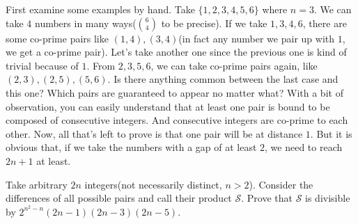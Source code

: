 \documentclass[nt_billal_v1.tex]{subfile}
\begin{document}
	\begin{solution}
		First examine some examples by hand. Take $\{1,2,3,4,5,6\}$ where $n=3$. We can take $4$ numbers in many ways($\binom{6}{4}$ to be precise). If we take $1,3,4,6$, there are some co-prime pairs like $(1,4),(3,4)$(in fact any number we pair up with $1$, we get a co-prime pair). Let's take another one since the previous one is kind of trivial because of $1$. From $2,3,5,6$, we can take co-prime pairs again, like $(2,3),(2,5),(5,6)$. Is there anything common between the last case and this one? Which pairs are guaranteed to appear no matter what? With a bit of observation, you can easily understand that at least one pair is bound to be composed of consecutive integers. And consecutive integers are co-prime to each other. Now, all that's left to prove is that one pair will be at distance $1$. But it is obvious that, if we take the numbers with a gap of at least $2$, we need to reach $2n+1$ at least.
	\end{solution}
	
	\begin{problem}
		Take arbitrary $2n$ integers(not necessarily distinct, $n>2$). Consider the differences of all possible pairs and call their product $\mathcal S$. Prove that $\mathcal S$ is divisible by $2^{n^2-n}(2n-1)(2n-3)(2n-5)$.
	\end{problem}
	
\end{document}
